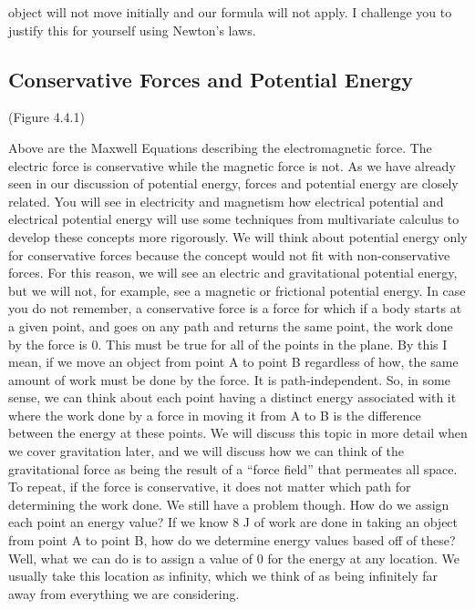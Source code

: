 \documentclass{article}[gray]
\numberwithin{equation}{subsection}
\begin{document}
object will not move initially and our formula will not apply. I challenge you to justify this for yourself using Newton’s laws. 

\subsection{Conservative Forces and Potential Energy}
\begin{center}
(Figure 4.4.1)
\end{center}
Above are the Maxwell Equations describing the electromagnetic force. The electric force is conservative while the magnetic force is not. 
As we have already seen in our discussion of potential energy, forces and potential energy are closely related. You will see in electricity and magnetism how electrical potential and electrical potential energy will use some techniques from multivariate calculus to develop these concepts more rigorously. We will think about potential energy only for conservative forces because the concept would not fit with non-conservative forces. For this reason, we will see an electric and gravitational potential energy, but we will not, for example, see a magnetic or frictional potential energy. In case you do not remember, a conservative force is a force for which if a body starts at a given point, and goes on any path and returns the same point, the work done by the force is 0. This must be true for all of the points in the plane. By this I mean, if we move an object from point A to point B regardless of how, the same amount of work must be done by the force. It is path-independent. So, in some sense, we can think about each point having a distinct energy associated with it where the work done by a force in moving it from A to B is the difference between the energy at these points. We will discuss this topic in more detail when we cover gravitation later, and we will discuss how we can think of the gravitational force as being the result of a “force field” that permeates all space. To repeat, if the force is conservative, it does not matter which path for determining the work done. We still have a problem though. How do we assign each point an energy value? If we know $8$ J of work are done in taking an object from point A to point B, how do we determine energy values based off of these? Well, what we can do is to assign a value of 0 for the energy at any location. We usually take this location as infinity, which we think of as being infinitely far away from everything we are considering.
\end{document}
